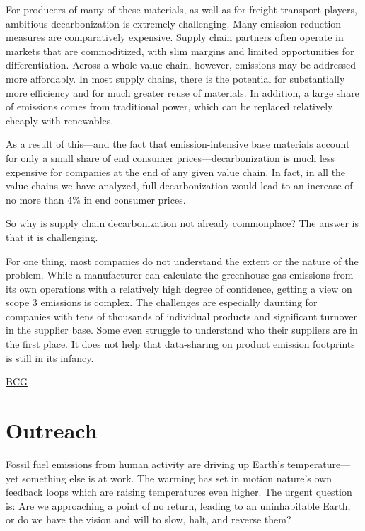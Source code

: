 \documentclass[
]{book}
\begin{document}
For producers of many of these materials, as well as for freight transport players, ambitious decarbonization is extremely challenging. Many emission reduction measures are comparatively expensive. Supply chain partners often operate in markets that are commoditized, with slim margins and limited opportunities for differentiation. Across a whole value chain, however, emissions may be addressed more affordably. In most supply chains, there is the potential for substantially more efficiency and for much greater reuse of materials.
In addition, a large share of emissions comes from traditional power, which can be replaced relatively cheaply with renewables.

As a result of this---and the fact that emission-intensive base materials account for only a small share of end consumer prices---decarbonization is much less expensive for companies at the end of any given value chain. In fact, in all the value chains we have analyzed, full decarbonization would lead to an increase of no more than 4\% in end consumer prices.

So why is supply chain decarbonization not already commonplace? The answer is that it is challenging.

For one thing, most companies do not understand the extent or the nature of the problem. While a manufacturer can calculate the greenhouse gas emissions from its own operations with a relatively high degree of confidence, getting a view on scope 3 emissions is complex. The challenges are especially daunting for companies with tens of thousands of individual products and significant turnover in the supplier base. Some even struggle to understand who their suppliers are in the first place. It does not help that data-sharing on product emission footprints is still in its infancy.

\href{https://www.bcg.com/publications/2021/fighting-climate-change-with-supply-chain-decarbonization}{BCG}

\hypertarget{outreach}{%
\chapter{Outreach}\label{outreach}}

Fossil fuel emissions from human activity are driving up Earth's temperature---
yet something else is at work.
The warming has set in motion nature's own feedback loops
which are raising temperatures even higher.
The urgent question is:
Are we approaching a point of no return, leading to an uninhabitable Earth,
or do we have the vision and will to slow, halt, and reverse them?
\end{document}
